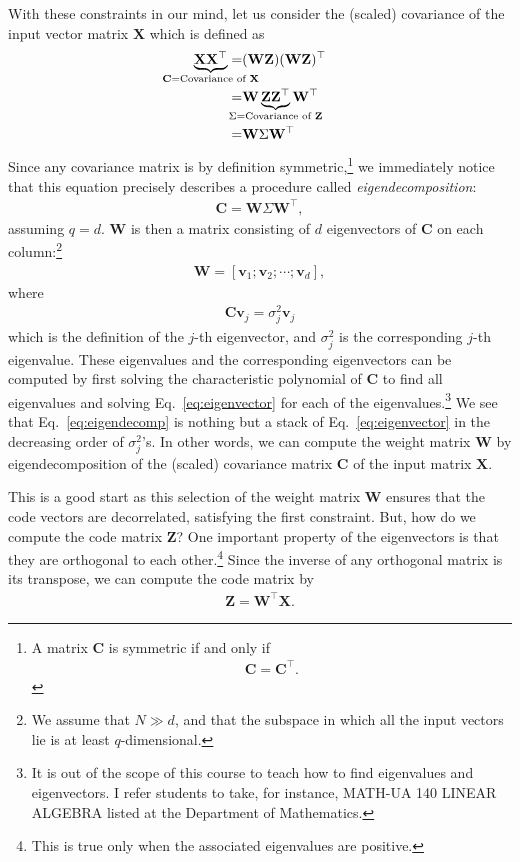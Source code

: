 \documentclass{report}
\newcommand{\vect}[1]{\mathbf{#1}}
\newcommand{\matr}[1]{\mathbf{#1}}
\newcommand{\vv}[0]{\vect{v}}
\newcommand{\mW}[0]{\matr{W}}
\newcommand{\mZ}[0]{\matr{Z}}
\newcommand{\mX}[0]{\matr{X}}
\newcommand{\mC}{\matr{C}}
\begin{document}
With these constraints in our mind, let us consider the (scaled) covariance of
the input vector matrix $\mX$ which is defined as
\begin{align*}
    \underbrace{\mX \mX^\top}_{\mathclap{\mC=\text{Covariance of }\mX}} =& 
    (\mW \mZ) (\mW \mZ)^\top \\
    =& \mW \underbrace{\mZ \mZ^\top}_{
\mathclap{\Sigma=\text{Covariance of }\mZ}} \mW^\top \\
=& \mW \Sigma \mW^\top
\end{align*}
Since any covariance matrix is by definition symmetric,\footnote{
    A matrix $\mC$ is symmetric if and only if
    \begin{align*}
        \mC = \mC^\top.
    \end{align*}
}
we immediately notice that this equation precisely describes a procedure called
{\it eigendecomposition}:
\begin{align}
    \label{eq:eigendecomp}
    \mC = \mW \Sigma \mW^\top,
\end{align}
assuming $q=d$. $\mW$ is then a matrix consisting of $d$ eigenvectors of
$\mC$ on each column:\footnote{
    We assume that $N \gg d$, and that the subspace in which all the input
    vectors lie is at least $q$-dimensional.
}
\begin{align*}
    \mW = \left[ \vv_1; \vv_2; \cdots; \vv_d \right],
\end{align*}
where
\begin{align}
    \label{eq:eigenvector}
    \mC \vv_j = \sigma_j^2 \vv_j
\end{align}
which is the definition of the $j$-th eigenvector, and $\sigma_j^2$ is the
corresponding $j$-th eigenvalue. These eigenvalues and the corresponding
eigenvectors can be computed by first solving the characteristic polynomial of
$\mC$ to find all eigenvalues and solving Eq.~\eqref{eq:eigenvector} for each of
the eigenvalues.\footnote{
    It is out of the scope of this course to teach how to find eigenvalues and
    eigenvectors. I refer students to take, for instance, MATH-UA 140 LINEAR
    ALGEBRA listed at the Department of Mathematics. 
}
We see that Eq.~\eqref{eq:eigendecomp} is nothing but a stack of
Eq.~\eqref{eq:eigenvector} in the decreasing order of $\sigma_j^2$'s.  In other
words, we can compute the weight matrix $\mW$ by eigendecomposition of the
(scaled) covariance matrix $\mC$ of the input matrix $\mX$.

This is a good start as this selection of the weight matrix $\mW$ ensures that
the code vectors are decorrelated, satisfying the first constraint. But, how do
we compute the code matrix $\mZ$? One important property of the eigenvectors is
that they are orthogonal to each other.\footnote{
    This is true only when the associated eigenvalues are positive. 
} Since the inverse of any orthogonal matrix is its transpose, we can compute
the code matrix by
\begin{align}
    \label{eq:pca_infer}
    \mZ = \mW^\top \mX.
\end{align}
\end{document}
